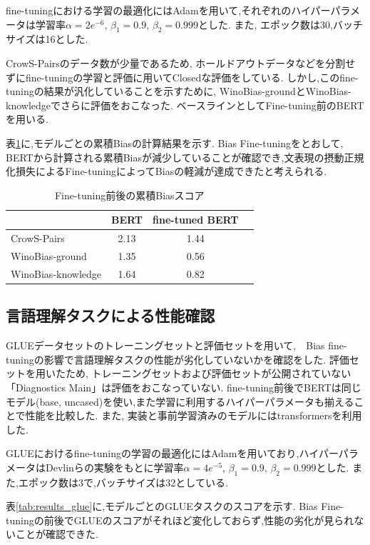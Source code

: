 \documentclass[
  platex, dvipdfmx %
]{nlp2021}
\begin{document}
fine-tuningにおける学習の最適化にはAdamを用いて,それぞれのハイパーパラメータは学習率$\alpha = 2e^{-6}$, $\beta_1 = 0.9$, $\beta_2 = 0.999$とした.
また, エポック数は30,バッチサイズは16とした.

CrowS-Pairsのデータ数が少量であるため, ホールドアウトデータなどを分割せずにfine-tuningの学習と評価に用いてClosedな評価をしている.
しかし,このfine-tuningの結果が汎化していることを示すために, WinoBias-groundとWinoBias-knowledgeでさらに評価をおこなった.
ベースラインとしてFine-tuning前のBERTを用いる.

表\ref{tab:results_bias}に,モデルごとの累積Biasの計算結果を示す.
Bias Fine-tuningをとおして, BERTから計算される累積Biasが減少していることが確認でき,文表現の摂動正規化損失によるFine-tuningによってBiasの軽減が達成できたと考えられる.

\begin{table}[h]
\centering
\label{tab:results_bias}
\begin{tabular}{lccc}
\hline
 &  BERT & fine-tuned BERT \\
\hline
CrowS-Pairs & 2.13 &  1.44 \\
WinoBias-ground & 1.35 &  0.56  \\
WinoBias-knowledge & 1.64 & 0.82 \\
\hline
\end{tabular}
\caption{Fine-tuning前後の累積Biasスコア}
\end{table}

\subsection{言語理解タスクによる性能確認}
GLUEデータセットのトレーニングセットと評価セットを用いて,　Bias fine-tuningの影響で言語理解タスクの性能が劣化していないかを確認をした.
評価セットを用いたため, トレーニングセットおよび評価セットが公開されていない「Diagnostics Main」は評価をおこなっていない.
fine-tuning前後でBERTは同じモデル(base, uncased)を使い,また学習に利用するハイパーパラメータも揃えることで性能を比較した.
また, 実装と事前学習済みのモデルにはtransformers\cite{wolf-etal-2020-transformers}を利用した.

GLUEにおけるfine-tuningの学習の最適化にはAdamを用いており,ハイパーパラメータはDevlinら\cite{devlin2018bert}の実験をもとに学習率$\alpha = 4e^{-5}$, $\beta_1 = 0.9$, $\beta_2 = 0.999$とした.
また,エポック数は3で,バッチサイズは32としている.

表\ref{tab:results_glue}に,モデルごとのGLUEタスクのスコアを示す.
Bias Fine-tuningの前後でGLUEのスコアがそれほど変化しておらず,性能の劣化が見られないことが確認できた.
\end{document}
